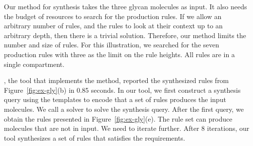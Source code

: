 Our method for synthesis takes the three glycan molecules as input.
It also needs the budget of resources to search for the production rules.
If we allow an arbitrary number of rules,
and the rules to look at their context up to
an arbitrary depth, %
then there is a trivial solution.
Therefore, our method limits the number and size of rules.
For this illustration, we searched for the seven production rules with
three as the limit on the rule heights.
All rules are in a single compartment.

\ourtool, the tool that implements the method, reported the synthesized rules from
Figure~\ref{fig:ex-gly}(b) in 0.85 seconds.
In our tool, we first construct a synthesis query using the templates to encode
that a set of rules produces the input molecules.
We call a solver to solve the synthesis query.
After the first query, we obtain the rules presented in Figure~\ref{fig:ex-gly}(e).
The rule set can produce molecules that are not in input.
We need to iterate further.
After 8 iterations, our tool synthesizes a set of rules that
satisfies the requirements.



